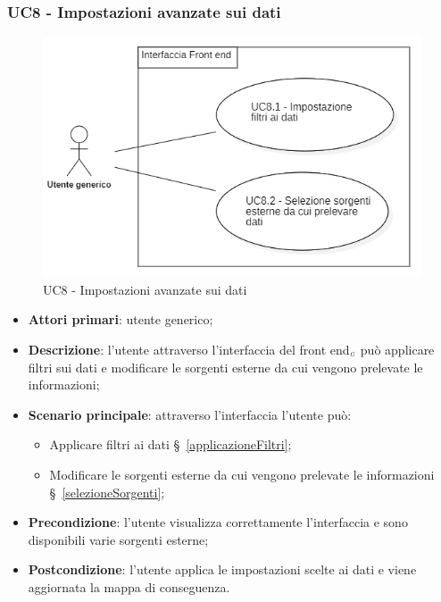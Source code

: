 \subsubsection{UC8 - Impostazioni avanzate sui dati}\label{impostazioniAvanzate}
\begin{center}
	\begin{figure}[H]
		\includegraphics[scale=0.7]{../immagini/attori_casi/uc8.png}
		\caption{UC8 - Impostazioni avanzate sui dati}
	\end{figure}
\end{center}
\begin{itemize}
	\item \textbf{Attori primari}: utente generico;
	\item \textbf{Descrizione}: l'utente attraverso l'interfaccia del front end$_{\scaleto{G}{3pt}}$ può applicare filtri sui dati e modificare le sorgenti esterne da cui vengono prelevate le informazioni;
	\item \textbf{Scenario principale}: attraverso l'interfaccia l'utente può:
	\begin{itemize}
		\item Applicare filtri ai dati \S~\ref{applicazioneFiltri};
		\item Modificare le sorgenti esterne da cui vengono prelevate le informazioni \S~\ref{selezioneSorgenti};
	\end{itemize}
	\item \textbf{Precondizione}: l'utente visualizza correttamente l'interfaccia e sono disponibili varie sorgenti esterne;
	\item \textbf{Postcondizione}: l'utente applica le impostazioni scelte ai dati e viene aggiornata la mappa di conseguenza. 
\end{itemize}

